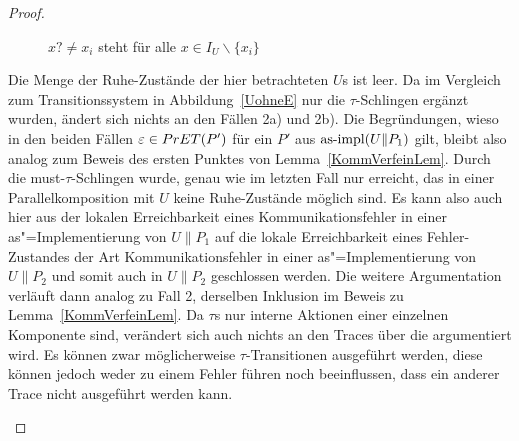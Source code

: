 \begin{proof}
\begin{itemize}
\begin{figure} [h!tbp]
\begin{center}
        \caption{$x?\neq x_i$ steht für alle $x\in I_U\backslash\{x_i\}$}
      \label{UohneEmitTau}
      \end{center}
      \end{figure}
      Die Menge der Ruhe-Zustände der hier betrachteten $U$s ist leer. Da im
      Vergleich zum Transitionssystem in Abbildung~\ref{UohneE} nur die
      $\tau$-Schlingen ergänzt wurden, ändert sich nichts an den Fällen 2a) und
      2b). Die Begründungen, wieso in den beiden Fällen $\varepsilon\in PrET
      (P')$ für ein $P'$ aus $\mathrm{as}\text{-}\mathrm{impl} (U\|P_1)$ gilt, bleibt also analog zum
      Beweis des ersten Punktes von Lemma~\ref{KommVerfeinLem}. Durch die
      must-$\tau$-Schlingen wurde, genau wie im letzten Fall nur erreicht, das
      in einer Parallelkomposition mit $U$ keine Ruhe-Zustände möglich sind. Es
      kann also auch hier aus der lokalen Erreichbarkeit eines
      Kommunikationsfehler in einer as"=Implementierung von $U\|P_1$ auf die
      lokale Erreichbarkeit eines Fehler-Zustandes der Art Kommunikationsfehler
      in einer as"=Implementierung von $U\|P_2$ und somit auch in $U\|P_2$
      geschlossen werden. Die weitere Argumentation verläuft dann analog zu
      Fall 2, derselben Inklusion im Beweis zu Lemma~\ref{KommVerfeinLem}. Da
      $\tau$s nur interne Aktionen einer einzelnen Komponente sind, verändert
      sich auch nichts an den Traces über die argumentiert wird. Es können zwar
      möglicherweise $\tau$-Transitionen ausgeführt werden, diese können jedoch
      weder zu einem Fehler führen noch beeinflussen, dass ein anderer Trace
      nicht ausgeführt werden kann.
  \end{itemize}


\end{proof}
